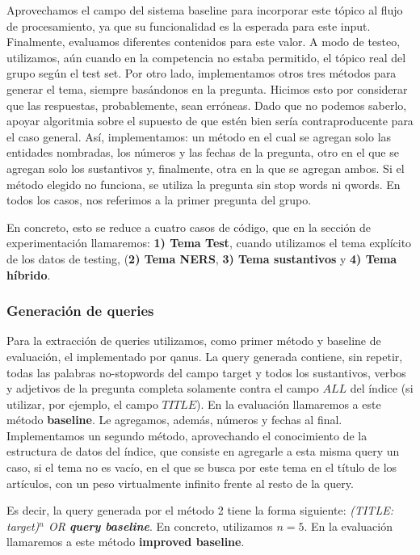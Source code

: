 Aprovechamos el campo  del sistema baseline para incorporar este tópico al flujo de procesamiento, ya que su funcionalidad es la esperada para este input.
Finalmente, evaluamos diferentes contenidos para este valor. A modo de testeo, utilizamos, aún cuando en la competencia no estaba permitido, el tópico real del grupo según el test set. Por otro lado, implementamos otros tres métodos para generar el tema, siempre basándonos en la pregunta. Hicimos esto por considerar que las respuestas, probablemente, sean erróneas. Dado que no podemos saberlo, apoyar algoritmia sobre el supuesto de que estén bien sería contraproducente para el caso general. Así, implementamos: un método en el cual se agregan solo las entidades nombradas, los números y las fechas de la pregunta, otro en el que se agregan solo los sustantivos y, finalmente, otra en la que se agregan ambos. Si el método elegido no funciona, se utiliza la pregunta sin stop words ni qwords. En todos los casos, nos referimos a la primer pregunta del grupo.

En concreto, esto se reduce a cuatro casos de código, que en la sección de experimentación llamaremos: \textbf{1) Tema Test}, cuando utilizamos el tema explícito de los datos de testing, (\textbf{2) Tema NERS}, \textbf{3) Tema sustantivos} y \textbf{4) Tema híbrido}.

\subsubsection{Generación de queries}

Para la extracción de queries utilizamos, como primer método y baseline de evaluación, el implementado por qanus. La query generada contiene, sin repetir, todas las palabras no-stopwords del campo target y todos los sustantivos, verbos y adjetivos de la pregunta completa solamente contra el campo $ALL$ del índice (si utilizar, por ejemplo, el campo $TITLE$). En la evaluación llamaremos a este método \textbf{baseline}. Le agregamos, además, números y fechas al final. Implementamos un segundo método, aprovechando el conocimiento de la estructura de datos del índice, que consiste en agregarle a esta misma query un caso, si el tema no es vacío, en el que se busca por este tema en el título de los artículos, con un peso virtualmente infinito frente al resto de la query.

Es decir, la query generada por el método 2 tiene la forma siguiente: \textit{(TITLE: target)$^n$ OR \textbf{query baseline}}. En concreto, utilizamos $n=5$. En la evaluación llamaremos a este método \textbf{improved baseline}.

